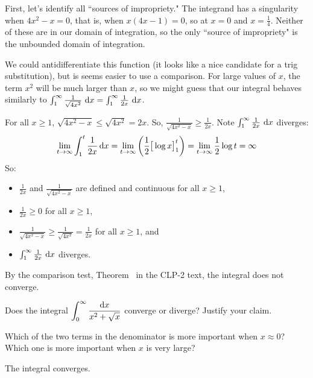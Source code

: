 \begin{solution}
First, let's identify all ``sources of impropriety." The integrand has a singularity when $4x^2-x=0$, that is, when $x(4x-1)=0$, so at $x=0$ and $x=\frac{1}{4}$. Neither of these are in our domain of integration, so the only ``source of impropriety" is the unbounded domain of integration.

We could antidifferentiate this function (it looks like a nice candidate for a trig substitution), but is seems easier to use a comparison. For large values of $x$, the term $x^2$ will be much larger than $x$, so we might guess that our integral behaves similarly to $\int_1^\infty \frac{1}{\sqrt{4x^2}}~\mathrm{d}x=\int_1^\infty \frac{1}{2x}~\mathrm{d}x$.


For all $x\ge 1$, $\sqrt{4x^2-x}\le\sqrt{4x^2}=2x$. So, $\frac{1}{\sqrt{4x^2-x}} \geq \frac{1}{2x}$. Note $\int_1^\infty \frac{1}{2x}~\mathrm{d}x$ diverges:
\begin{align*}\lim_{t\rightarrow\infty}\int_1^t\frac{1}{2x}\,\mathrm{d}x
=\lim_{t\rightarrow\infty}\left(\frac{1}{2} \big[\log x\big]_1^t\right)
=\lim_{t\rightarrow\infty}\frac{1}{2} \log t
=\infty
\end{align*}
So:
\begin{itemize}
\item $\frac{1}{2x}$ and $\frac{1}{\sqrt{4x^2-x}}$ are defined and continuous for all $x \geq 1$,
\item $\frac{1}{2x} \geq 0$ for all $x \geq 1$,
\item $\frac{1}{\sqrt{4x^2-x}} \ge\frac{1}{\sqrt{4x^2}} = \frac{1}{2x} $ for all $x \ge 1$, and
\item $\int_1^\infty \frac{1}{2x}~\mathrm{d}x$ diverges.
\end{itemize}
By the comparison test, Theorem~ in the CLP-2 text, the integral does not converge.
\end{solution}

\begin{Mquestion}[2001A]
Does the integral $\displaystyle\int_0^\infty\frac{\mathrm{d}x}{x^2+\sqrt{x}}$
converge or diverge? Justify your claim.
\end{Mquestion}

\begin{hint}
Which of the two terms in the denominator is more important when $x\approx
0$? Which one is more important when $x$ is very large?
\end{hint}

\begin{answer}
The integral converges.
\end{answer}

